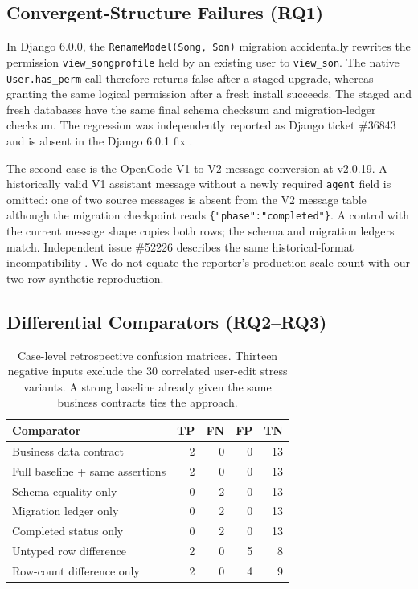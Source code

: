 \subsection{Convergent-Structure Failures (RQ1)}
In Django 6.0.0, the \texttt{RenameModel(Song, Son)} migration accidentally
rewrites the permission \texttt{view\_songprofile} held by an existing user
to \texttt{view\_son}. The native \texttt{User.has\_perm} call therefore
returns false after a staged upgrade, whereas granting the same logical
permission after a fresh install succeeds. The staged and fresh databases have
the same final schema checksum and migration-ledger checksum. The regression
was independently reported as Django ticket \#36843 and is absent in the
Django 6.0.1 fix \cite{django36843}.

The second case is the OpenCode V1-to-V2 message conversion at v2.0.19. A
historically valid V1 assistant message without a newly required
\texttt{agent} field is omitted: one of two source messages is absent from the
V2 message table although the migration checkpoint reads
\texttt{\{"phase":"completed"\}}. A control with the current message
shape copies both rows; the schema and migration ledgers match. Independent
issue \#52226 describes the same historical-format incompatibility
\cite{opencode52226}. We do not equate the reporter's production-scale count
with our two-row synthetic reproduction.

\subsection{Differential Comparators (RQ2--RQ3)}
\begin{table}[t]
  \centering
  \caption{Case-level retrospective confusion matrices. Thirteen negative
  inputs exclude the 30 correlated user-edit stress variants. A strong
  baseline already given the same business contracts ties the approach.}
  \label{tab:n22-confusion}
  \begin{tabular}{lrrrr}
    \toprule
    Comparator & TP & FN & FP & TN \\
    \midrule
    Business data contract & 2 & 0 & 0 & 13 \\
    Full baseline + same assertions & 2 & 0 & 0 & 13 \\
    Schema equality only & 0 & 2 & 0 & 13 \\
    Migration ledger only & 0 & 2 & 0 & 13 \\
    Completed status only & 0 & 2 & 0 & 13 \\
    Untyped row difference & 2 & 0 & 5 & 8 \\
    Row-count difference only & 2 & 0 & 4 & 9 \\
    \bottomrule
  \end{tabular}
\end{table}

